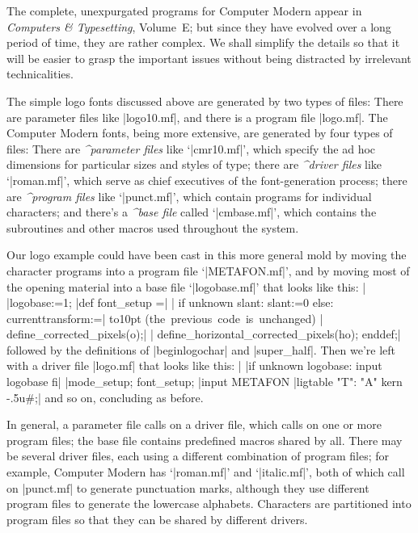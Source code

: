 The complete, unexpurgated programs for Computer Modern appear in {\sl
Computers \& Typesetting}, Volume~E\null; but since they have evolved
over a long period of time, they are rather complex. We shall simplify
the details so that it will be easier to grasp the important issues
without being distracted by irrelevant technicalities.

The simple logo fonts discussed above are generated by two types
of files: There are parameter files like |logo10.mf|, and there is
a program file |logo.mf|. The Computer Modern fonts, being more
extensive, are generated by four types of files: There are
{\sl^{parameter files}\/} like `|cmr10.mf|', which specify the
ad hoc dimensions for particular sizes and styles of type; there are
{\sl^{driver files}\/} like `|roman.mf|', which serve as chief
executives of the font-generation process; there are
{\sl^{program files}\/} like `|punct.mf|', which contain programs
for individual characters; and there's a {\sl^{base file}\/} called
`|cmbase.mf|', which contains the subroutines and other macros used
throughout the system.

Our logo example could have been cast in this more general mold by moving
the character programs into a program file `|METAFON.mf|', and by moving
most of the opening material into a base file `|logobase.mf|'
that looks like this:
\beginlines
|%
|logobase:=1;           %
\smallskip
|def font_setup =|
| if unknown slant: slant:=0 else: currenttransform:=|
\qquad\smash{\vdots}\qquad\vbox to10pt{}%
 \hbox{(the previous code is unchanged)}
| define_corrected_pixels(o);|
| define_horizontal_corrected_pixels(ho); enddef;|
\endlines
followed by the definitions of |beginlogochar| and |super_half|.
Then we're left with a driver file |logo.mf| that looks like this:
\beginlines
|%
|if unknown logobase: input logobase fi|
\smallskip
|mode_setup; font_setup;                  %
|input METAFON                            %
\smallskip
|ligtable "T": "A" kern -.5u#;|
\weakendlines
and so on, concluding as before.

In general, a parameter file calls on a driver file, which calls on
one or more program files; the base file contains predefined macros
shared by all. There may be several driver files, each using a
different combination of program files; for example, Computer Modern
has `|roman.mf|' and `|italic.mf|', %
both of which call on |punct.mf| to generate punctuation marks,
although they use different program files to generate the lowercase
alphabets. Characters are partitioned into program files so that
they can be shared by different drivers.

